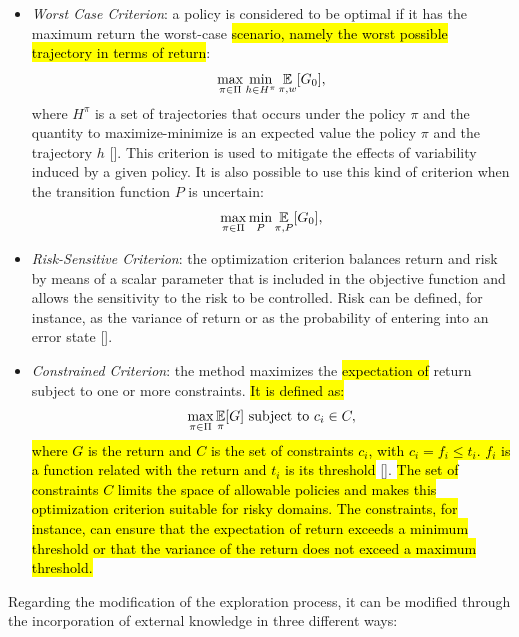 \begin{itemize}
	\item \emph{Worst Case Criterion}: a policy is considered to be optimal if it has the maximum return \wrt the worst-case \hl{scenario, namely the worst possible trajectory in terms of return}:
	\begin{align}
	\max_{\pi \in \Pi}\min_{h \in H^{\pi}} \operatorname*{\mathbb{E}}_{\pi, w}[G_{0}],
	\end{align}
	where $H^{\pi}$ is a set of trajectories that occurs under the policy $\pi$ and the quantity to maximize-minimize is an expected value \wrt the policy $\pi$ and the trajectory $h$ [\cite{Heger1994ConsiderationOR}]. This criterion is used to mitigate the effects of variability induced by a given policy. It is also possible to use this kind of criterion when the transition function $P$ is uncertain:
	\begin{align}
	\max_{\pi \in \Pi}\min_{P} \operatorname*{\mathbb{E}}_{\pi, P}[G_{0}],
	\end{align}
	\item \emph{Risk-Sensitive Criterion}: the optimization criterion balances return and risk by means of a scalar parameter that is included in the objective function and allows the sensitivity to the risk to be controlled. Risk can be defined, for instance, as the variance of return or as the probability of entering into an error state [\cite{Geibel2005RiskSensitiveRL}].
	\item \emph{Constrained Criterion}: the method maximizes the \hl{expectation of} return subject to one or more constraints. \hl{It is defined as:}
	\begin{align}
		\max_{\pi \in \Pi} \operatorname*{\mathbb{E}}_{\pi}[G] \text{ subject to }c_i \in C,
	\end{align}
	\hl{where $G$ is the return and $C$ is the set of constraints $c_i$, with $c_i = f_i \leq t_i$. $f_i$ is a function related with the return and $t_i$ is its threshold} [\cite{moldovan2012safe}]. \hl{The set of constraints $C$ limits the space of allowable policies and makes this optimization criterion suitable for risky domains. The constraints, for instance, can ensure that the expectation of return exceeds a minimum threshold or that the variance of the return does not exceed a maximum threshold.}
	
\end{itemize}
Regarding the modification of the exploration process, it can be modified through the incorporation of external knowledge in three different ways:
